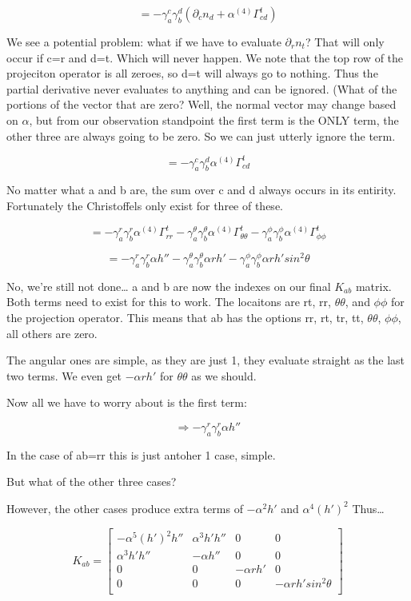 \documentclass[landscape,letterpaper,10pt,english]{article}
\begin{document}
\[ = -\gamma^c_a \gamma^d_b (\partial_c n_d + \alpha {}^{(4)}\Gamma^t_{cd})\]

    We see a potential problem: what if we have to evaluate
\(\partial_r n_t\)? That will only occur if c=r and d=t. Which will
never happen. We note that the top row of the projeciton operator is all
zeroes, so d=t will always go to nothing. Thus the partial derivative
never evaluates to anything and can be ignored. (What of the portions of
the vector that are zero? Well, the normal vector may change based on
\(\alpha\), but from our observation standpoint the first term is the
ONLY term, the other three are always going to be zero. So we can just
utterly ignore the term.

\[ = -\gamma^c_a \gamma^d_b \alpha {}^{(4)}\Gamma^t_{cd}\]

No matter what a and b are, the sum over c and d always occurs in its
entirity. Fortunately the Christoffels only exist for three of these.

\[ = -\gamma^r_a \gamma^r_b \alpha {}^{(4)}\Gamma^t_{rr} -\gamma^\theta_a \gamma^\theta_b \alpha {}^{(4)}\Gamma^t_{\theta\theta}-\gamma^\phi_a \gamma^\phi_b \alpha {}^{(4)}\Gamma^t_{\phi\phi}\]

\[ = -\gamma^r_a \gamma^r_b \alpha h'' -\gamma^\theta_a \gamma^\theta_b \alpha rh' -\gamma^\phi_a \gamma^\phi_b \alpha rh'sin^2\theta\]

    No, we're still not done\ldots{} a and b are now the indexes on our
final \(K_{ab}\) matrix. Both terms need to exist for this to work. The
locaitons are rt, rr, \(\theta\theta\), and \(\phi\phi\) for the
projection operator. This means that ab has the options rr, rt, tr, tt,
\(\theta\theta\), \(\phi\phi\), all others are zero.

The angular ones are simple, as they are just 1, they evaluate straight
as the last two terms. We even get \(-\alpha rh'\) for \(\theta\theta\)
as we should.

Now all we have to worry about is the first term:

\[ \Rightarrow -\gamma^r_a \gamma^r_b \alpha h'' \]

In the case of ab=rr this is just antoher 1 case, simple.

But what of the other three cases?

However, the other cases produce extra terms of \(-\alpha^2h'\) and
\(\alpha^4(h')^2\) Thus\ldots{}

    \[ K_{ab} = \begin{bmatrix}
-\alpha^5(h')^2 h'' & \alpha^3 h' h'' & 0 & 0 \\
\alpha^3 h' h'' & -\alpha h'' & 0 & 0 \\
0 & 0 & -\alpha rh' & 0 \\
0 & 0 & 0 & -\alpha rh' sin^2\theta \\
\end{bmatrix}\]
\end{document}

